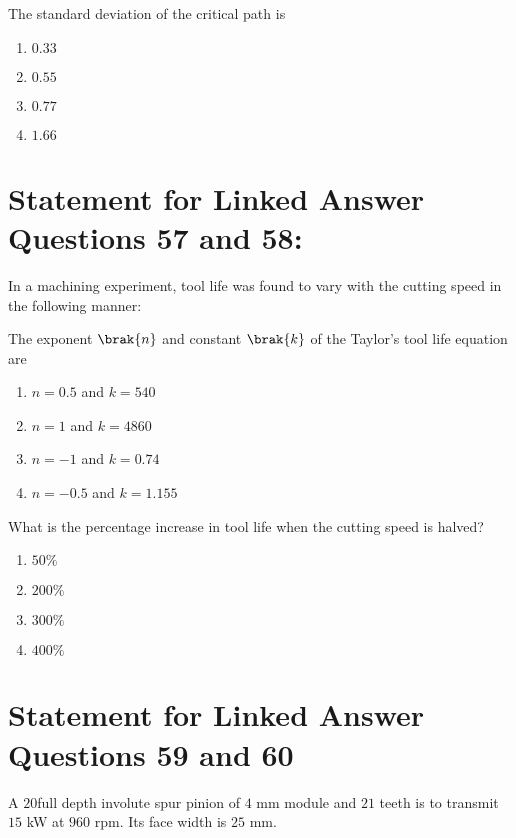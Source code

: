     \item The standard deviation of the critical path is
    \begin{enumerate}
        \item $0.33$
        \item $0.55$
        \item $0.77$
        \item $1.66$
    \end{enumerate}

    

   \section{ Statement for Linked Answer Questions 57 and 58:}
    
    In a machining experiment, tool life was found to vary with the cutting speed in the following manner:
    
    
    \item The exponent $\brak{n}$ and constant $\brak{k}$ of the Taylor's tool life equation are
    \begin{enumerate}
        \item $n = 0.5$ and $k = 540$
        \item $n = 1$ and $k = 4860$
        \item $n = -1$ and $k = 0.74$
        \item $n = -0.5$ and $k = 1.155$
    \end{enumerate}
    \item  What is the percentage increase in tool life when the cutting speed is halved?
    \begin{enumerate}
        \item $50\%$
        \item $200\%$
        \item $300\%$
        \item $400\%$
    \end{enumerate}

\section{ Statement for Linked Answer Questions 59 and 60}
    
  \item   A $20$\degree full depth involute spur pinion of $4$ mm module and $21$ teeth is to transmit $15$ kW at $960$ rpm. Its face width is $25$ mm.

